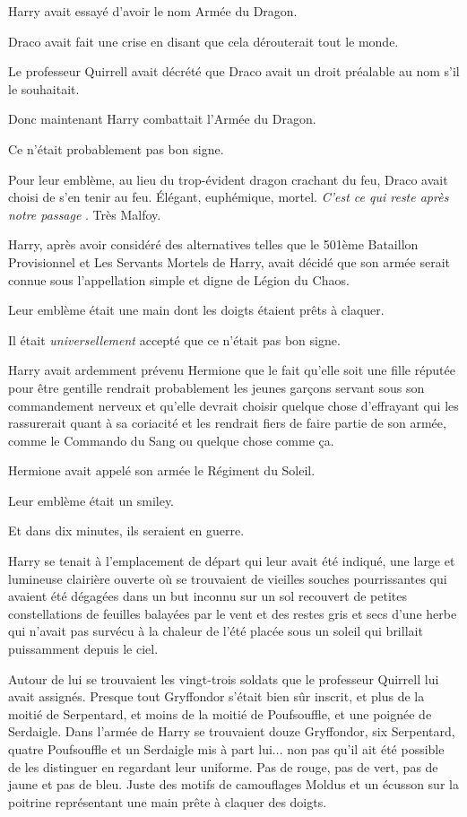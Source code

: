 Harry avait essayé d'avoir le nom Armée du Dragon.

Draco avait fait une crise en disant que cela dérouterait tout le monde.

Le professeur Quirrell avait décrété que Draco avait un droit préalable au nom s'il le souhaitait.

Donc maintenant Harry combattait l'Armée du Dragon.

Ce n'était probablement pas bon signe.

Pour leur emblème, au lieu du trop-évident dragon crachant du feu, Draco avait choisi de s'en tenir au feu. Élégant, euphémique, mortel. \emph{C'est ce qui reste après notre passage} . Très Malfoy.

Harry, après avoir considéré des alternatives telles que le 501ème Bataillon Provisionnel et Les Servants Mortels de Harry, avait décidé que son armée serait connue sous l'appellation simple et digne de Légion du Chaos.

Leur emblème était une main dont les doigts étaient prêts à claquer.

Il était \emph{universellement } accepté que ce n'était pas bon signe.

Harry avait ardemment prévenu Hermione que le fait qu'elle soit une fille réputée pour être gentille rendrait probablement les jeunes garçons servant sous son commandement nerveux et qu'elle devrait choisir quelque chose d'effrayant qui les rassurerait quant à sa coriacité et les rendrait fiers de faire partie de son armée, comme le Commando du Sang ou quelque chose comme ça.

Hermione avait appelé son armée le Régiment du Soleil.

Leur emblème était un smiley.

Et dans dix minutes, ils seraient en guerre.

Harry se tenait à l'emplacement de départ qui leur avait été indiqué, une large et lumineuse clairière ouverte où se trouvaient de vieilles souches pourrissantes qui avaient été dégagées dans un but inconnu sur un sol recouvert de petites constellations de feuilles balayées par le vent et des restes gris et secs d'une herbe qui n'avait pas survécu à la chaleur de l'été placée sous un soleil qui brillait puissamment depuis le ciel.

Autour de lui se trouvaient les vingt-trois soldats que le professeur Quirrell lui avait assignés. Presque tout Gryffondor s'était bien sûr inscrit, et plus de la moitié de Serpentard, et moins de la moitié de Poufsouffle, et une poignée de Serdaigle. Dans l'armée de Harry se trouvaient douze Gryffondor, six Serpentard, quatre Poufsouffle et un Serdaigle mis à part lui... non pas qu'il ait été possible de les distinguer en regardant leur uniforme. Pas de rouge, pas de vert, pas de jaune et pas de bleu. Juste des motifs de camouflages Moldus et un écusson sur la poitrine représentant une main prête à claquer des doigts.

